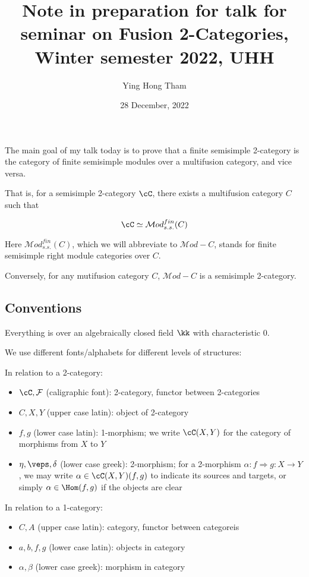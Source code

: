 \documentclass[12pt]{article}
\newcommand{\Mod}{{\mathcal{M}od}}
\begin{document}
\title{Note in preparation for talk for seminar on Fusion 2-Categories, Winter semester 2022, UHH}
\author{Ying Hong Tham}
\date{28 December, 2022}
\maketitle


The main goal of my talk today is to prove that
a finite semisimple 2-category is the
category of finite semisimple modules
over a multifusion category,
and vice versa.


That is, for a semisimple 2-category $\cC$,
there exists a multifusion category $C$
such that

\[
\cC \simeq \Mod_{s.s.}^{fin}(C)
\]

Here $\Mod_{s.s.}^{fin}(C)$,
which we will abbreviate to $\Mod-C$,
stands for finite semisimple right module categories over $C$.

Conversely, for any mutifusion category $C$,
$\Mod-C$ is a semisimple 2-category.



\subsection{Conventions}

Everything is over an algebraically closed field $\kk$
with characteristic 0.

We use different fonts/alphabets for different levels
of structures:

In relation to a 2-category:
\begin{itemize}
\item $\cC,\mathcal{F}$ (caligraphic font): 2-category,
	functor between 2-categories

\item $C,X,Y$ (upper case latin): object of 2-category

\item $f,g$ (lower case latin): 1-morphism;
	we write $\cC(X,Y)$ for the category of morphisms
	from $X$ to $Y$

\item $\eta,\veps,\delta$ (lower case greek): 2-morphism;
	for a 2-morphism $\alpha: f \Rightarrow g: X \to Y$,
	we may write $\alpha \in \cC(X,Y)(f,g)$
	to indicate its sources and targets,
	or simply $\alpha \in \Hom(f,g)$ if the objects are clear
\end{itemize}

In relation to a 1-category:
\begin{itemize}
\item $C,A$ (upper case latin): category, functor between categoreis

\item $a,b,f,g$ (lower case latin): objects in category

\item $\alpha,\beta$ (lower case greek): morphism in category
\end{itemize}
\end{document}
